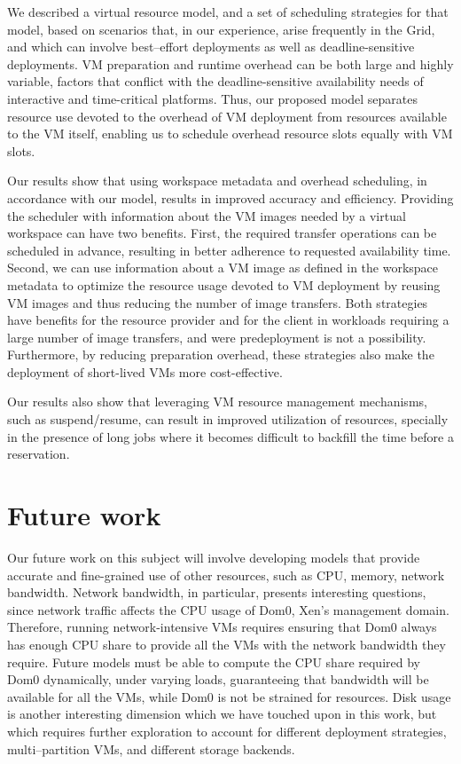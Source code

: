 We described a virtual resource model, and a set of scheduling
strategies for that model, based on scenarios that, in our experience,
arise frequently in the Grid, and which can involve best--effort deployments as well as
deadline{}-sensitive deployments. VM preparation and
runtime overhead can be both large and highly variable, factors that
conflict with the deadline{}-sensitive availability needs of
interactive and time{}-critical platforms. Thus, our proposed model
separates resource use devoted to the overhead of VM deployment from
resources available to the VM itself, enabling us to schedule overhead
resource slots equally with VM slots.

Our results show that using workspace metadata and overhead scheduling, in accordance with our model, results in improved accuracy and efficiency. Providing the scheduler with information about the VM images needed by a virtual workspace can have two benefits. First, the required transfer operations can be scheduled in advance, resulting in better adherence to requested availability time. Second, we can use information about a VM image as defined in the workspace metadata to optimize the resource usage devoted to VM deployment by reusing VM images and thus reducing the number of image transfers. Both strategies have benefits for the resource provider and for the client in workloads requiring a large number of image transfers, and were predeployment is not a possibility. Furthermore, by reducing preparation overhead, these strategies also make the deployment of short{}-lived VMs more cost{}-effective.

Our results also show that leveraging VM resource management mechanisms, such as suspend/resume, can result in improved utilization of resources, specially in the presence of long jobs where it becomes difficult to backfill the time before a reservation.

\section{Future work}

Our future work on this subject will involve developing models that provide accurate and fine-grained use of other resources, such as CPU, memory, network bandwidth. Network bandwidth, in particular, presents interesting questions, since network traffic affects the CPU usage of Dom0, Xen's management domain. Therefore, running network-intensive VMs requires ensuring that Dom0 always has enough CPU share to provide all the VMs with the network bandwidth they require. Future models must be able to  compute the CPU share required by Dom0 dynamically, under varying loads, guaranteeing that bandwidth will be available for all the VMs, while Dom0 is not be strained for resources. Disk usage is another interesting dimension which we have touched upon in this work, but which requires further exploration to account for different deployment strategies, multi--partition VMs, and different storage backends.


